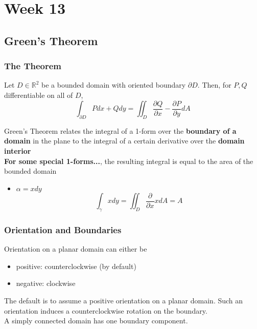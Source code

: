 \chapter{Week 13}

\section{Green's Theorem}

\subsection{The Theorem}
\begin{framed}
   Let $D \in \mathbb{R}^2$ be a bounded domain with oriented boundary $ \partial D$. Then, for $ P, Q$ differentiable on all of $D$, 
   \[
      \int_{\partial D}^{ } Pdx + Qdy = \iint_{D} \frac{\partial Q}{\partial x} - \frac{\partial P}{\partial y} dA 
   \] 
\end{framed}

Green's Theorem relates the integral of a 1-form over the \textbf{boundary of a domain} in the plane to the integral of a certain derivative over the \textbf{domain interior} \\

\textbf{For some special 1-forms...}, the resulting integral is equal to the area of the bounded domain
\begin{itemize}
   \item $\alpha = xdy $
      \[
         \int_{\gamma}^{}   xdy= \iint_{D} \frac{\partial }{\partial x}x dA = A
      \] 
\end{itemize}

\subsection{Orientation and Boundaries}

Orientation on a planar domain can either be
\begin{itemize}
   \item positive: counterclockwise (by default)
   \item negative: clockwise
\end{itemize}

The default is to assume a positive orientation on a planar domain. Such an orientation induces a counterclockwise rotation on the boundary. \\

A simply connected domain has one boundary component. \\

